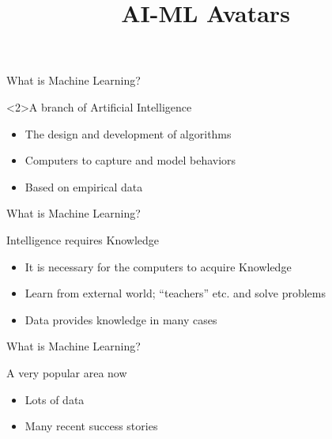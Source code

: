\documentclass[aspectratio=169,14pt]{beamer}
\title[AI-ML Avatars] {AI-ML Avatars}
\begin{document}
{\1
\begin{frame}
  \titlepage
\end{frame}
}

\begin{frame}{What is Machine Learning?}
\begin{block}<2>{A branch of Artificial Intelligence}
\begin{itemize}
        \item The design and development of algorithms
        \item Computers to capture and model behaviors
        \item Based on empirical data
    \end{itemize}
\end{block}
\end{frame}

\begin{frame}{What is Machine Learning?}
\begin{block}{Intelligence requires Knowledge}
    \begin{itemize}
        \item It is necessary for the computers to acquire Knowledge
        \item Learn from external world; “teachers” etc. and solve problems
        \item Data provides knowledge in many cases
    \end{itemize}
\end{block}
\end{frame}



\begin{frame}{What is Machine Learning?}
\begin{block}{A very popular area now}
    \begin{itemize}
        \item Lots of data
        \item Many recent success stories
    \end{itemize}
\end{block}
\end{frame}
\end{document}
